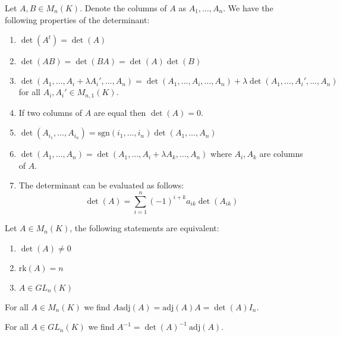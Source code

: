         \begin{property}
			\label{linalgebra:determinant_properties}
            Let $A,B\in M_n(K)$. Denote the columns of $A$ as $A_1, \dotso, A_n$. We have the following properties of the determinant:
            \begin{enumerate}
				\item $\det(A^t) = \det(A)$
                \item $\det(AB) = \det(BA) = \det(A)\det(B)$
                \item $\det(A_1, \dotso, A_i+\lambda A_i', \dotso, A_n) = \det(A_1, \dotso, A_i, \dotso, A_n) + \lambda\det(A_1, \dotso,A_i', \dotso, A_n)$ for all $A_i,A_i'\in M_{n,1}(K)$.
                \item If two columns of $A$ are equal then $\det(A) = 0$.
                \item $\det(A_{i_1},\dotso,A_{i_n}) = \text{sgn}(i_1,\dotso,i_n)\det(A_1,\dotso,A_n)$
                \item $\det(A_1,\dotso,A_n) = \det(A_1,\dotso,A_i+\lambda A_k,\dotso,A_n)$ where $A_i, A_k$ are columns of $A$.
                \item The determinant can be evaluated as follows:
                	\begin{equation}
						\det(A) = \sum_{i=1}^n(-1)^{i+k}a_{ik}\det(A_{ik})
					\end{equation}
			\end{enumerate}
		\end{property}
        
        \begin{theorem}
			\label{linalgebra:theorem:rank_det_equivalence}
            Let $A\in M_n(K)$, the following statements are equivalent:
            \begin{enumerate}
				\item $\det(A) \neq 0$
                \item $\text{rk}(A) = n$
                \item $A\in GL_n(K)$
			\end{enumerate}
		\end{theorem}
        \begin{theorem}
			\label{linalgebra:theorem:adjugate_matrix}
            For all $A\in M_n(K)$ we find $A\text{adj}(A) = \text{adj}(A)A = \det(A)I_n$.
		\end{theorem}
        \begin{theorem}
			\label{linalgebra:theorem:determinant_inverse}
            For all $A\in GL_n(K)$ we find $A^{-1} = \det(A)^{-1}\ \text{adj}(A)$.
		\end{theorem}
        
